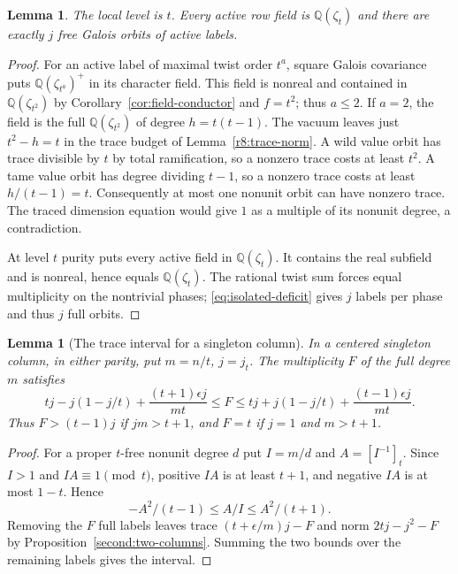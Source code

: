 \documentclass[11pt,a4paper]{article}
\numberwithin{equation}{section}
\newtheorem{lemma}[theorem]{Lemma}
\theoremstyle{remark}
\newcommand{\QQ}{\mathbb Q}
\begin{document}
\begin{lemma}\label{fam:M:9.1}\label{nov:local-level}
The local level is $t$. Every active
row field is $\mathbb Q(\zeta_t)$ and there are exactly $j$ free
Galois orbits of active labels.
\end{lemma}
\begin{proof}
For an active label of maximal twist order $t^a$, square Galois
covariance puts $\QQ(\zeta_{t^a})^+$ in its character field.
This field is nonreal and contained in $\QQ(\zeta_{t^2})$ by
Corollary~\ref{cor:field-conductor} and $f=t^2$; thus $a\le2$.
If $a=2$, the field is the full $\QQ(\zeta_{t^2})$ of degree
$h=t(t-1)$. The vacuum leaves just $t^2-h=t$ in the trace budget
of Lemma~\ref{r8:trace-norm}. A wild value orbit has trace divisible
by $t$ by total ramification, so a nonzero trace costs at least $t^2$.
A tame value orbit has degree dividing $t-1$, so a nonzero trace costs
at least $h/(t-1)=t$. Consequently at most one nonunit orbit can
have nonzero trace. The traced dimension equation would give $1$ as a
multiple of its nonunit degree, a contradiction.

At level $t$ purity puts every active field in $\QQ(\zeta_t)$.
It contains the real subfield and is nonreal, hence equals $\QQ(\zeta_t)$. The rational twist sum forces
equal multiplicity on the nontrivial phases; \eqref{eq:isolated-deficit}
gives $j$ labels per phase and thus $j$ full orbits.
\end{proof}

\begin{lemma}[The trace interval for a singleton column]\label{main:singleton-trace-interval}
In a centered singleton column, in either parity, put $m=n/t$, $j=j_t$.
The multiplicity $F$ of the full degree $m$ satisfies
\[
 tj-j(1-j/t)+\frac{(t+1)\epsilon j}{mt}\le F\le
 tj+j(1-j/t)+\frac{(t-1)\epsilon j}{mt}.
\]
Thus $F>(t-1)j$ if $jm>t+1$, and $F=t$ if $j=1$ and $m>t+1$.
\end{lemma}
\begin{proof}
For a proper $t$-free nonunit degree $d$ put $I=m/d$ and $A=[I^{-1}]_t$.
Since $I>1$ and $IA\equiv1\pmod t$, positive $IA$ is at least $t+1$,
and negative $IA$ is at most $1-t$. Hence
\[
                 -A^2/(t-1)\le A/I\le A^2/(t+1).
\]
Removing the $F$ full labels leaves trace $(t+\epsilon/m)j-F$ and norm
$2tj-j^2-F$ by Proposition~\ref{second:two-columns}. Summing the two
bounds over the remaining labels gives the interval.
\end{proof}
\end{document}
